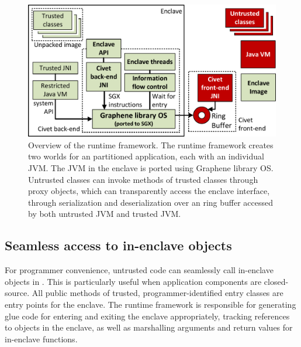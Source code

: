 
\begin{figure}[t!]
\centering
\includegraphics[width=4.5in]{civet/figures/civet-structure.pdf}
\caption[Overview of the \sysname{} runtime framework]
{Overview of the \sysname{} runtime framework.
The \sysname{} runtime framework creates two worlds for an partitioned \java{} application, each with an individual JVM.
The JVM in the enclave is ported using Graphene library OS.
Untrusted classes can invoke methods of trusted classes through proxy objects,
which can transparently access the enclave interface, through serialization
and deserialization over an ring buffer accessed by both untrusted JVM and trusted JVM. }
\label{fig:civet:runtime}
\end{figure}


\subsection{Seamless access to in-enclave objects}
\label{sec:civet:concept:interface}

For programmer convenience, 
untrusted code can seamlessly call in-enclave objects in \sysname{}.
This is particularly useful when application components are closed-source.
All public methods of trusted, programmer-identified entry classes are entry points for the enclave.
The \sysname{} runtime framework is responsible for generating glue code for entering and exiting
the enclave appropriately, tracking references to objects in the enclave, 
as well as marshalling arguments and return values for in-enclave functions.

